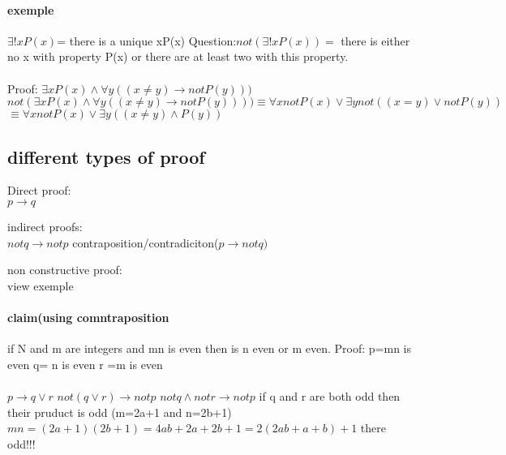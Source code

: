 \documentclass[a4paper,10pt]{article}
\begin{document}
\paragraph{exemple}
$\exists !xP(x)$= there is a unique xP(x)
\newline
Question:$not(\exists !xP(x))=$ there is either no x with property P(x) or there are at least two with this property.
\paragraph{}
Proof:
\newline
$\exists xP(x)\wedge \forall y((x\neq y)\longrightarrow notP(y)))$
\newline
$not(\exists xP(x)\wedge \forall y((x\neq y)\longrightarrow notP(y))))\equiv \forall x notP(x)\vee\exists ynot((x=y)\vee notP(y))$
\newline
$\equiv \forall x notP(x)\vee\exists y((x\neq y)\wedge P(y))$

\subsection{different types of proof}
\begin{description}
 \item Direct proof:\\{$p\longrightarrow q$}
 \item indirect proofs:\\{$notq\longrightarrow not p$ contraposition/contradiciton($p\longrightarrow notq)$}
 \item non constructive proof:\\{view exemple}
\end{description}

\paragraph{claim(using comntraposition}
if N and m are integers and mn is even then is n even or m even.
\newline
Proof:
\newline
p=mn is even
\newline
q= n is even
\newline
r =m is even
\paragraph{}
$p\longrightarrow q\vee r$
\newline
$not(q\vee r)\longrightarrow notp$
\newline
$notq \wedge notr \longrightarrow notp$
\newline
if q and r are both odd then their pruduct is odd (m=2a+1 and n=2b+1)
\newline
$mn=(2a+1)(2b+1)=4ab+2a+2b+1=2(2ab+a+b)+1$ there odd!!!
\end{document}
